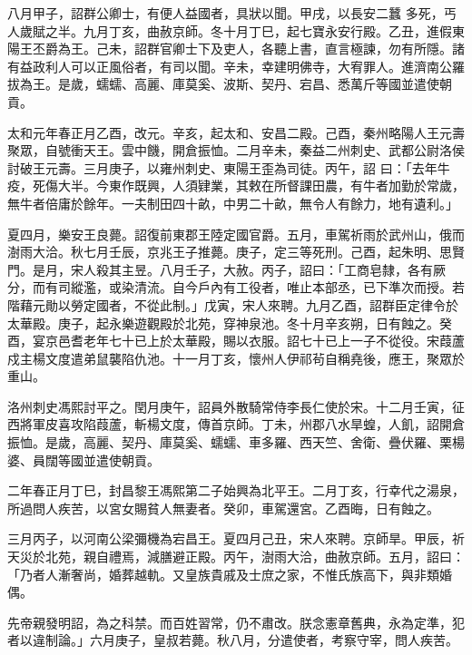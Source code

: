 \begin{pinyinscope}
 八月甲子，詔群公卿士，有便人益國者，具狀以聞。甲戌，以長安二蠶
 多死，丐人歲賦之半。九月丁亥，曲赦京師。冬十月丁巳，起七寶永安行殿。乙丑，進假東陽王丕爵為王。己未，詔群官卿士下及吏人，各聽上書，直言極諫，勿有所隱。諸有益政利人可以正風俗者，有司以聞。辛未，幸建明佛寺，大宥罪人。進濟南公羅拔為王。是歲，蠕蠕、高麗、庫莫奚、波斯、契丹、宕昌、悉萬斤等國並遣使朝貢。



 太和元年春正月乙酉，改元。辛亥，起太和、安昌二殿。己酉，秦州略陽人王元壽聚眾，自號衝天王。雲中饑，開倉振恤。二月辛未，秦益二州刺史、武都公尉洛侯討破王元壽。三月庚子，以雍州刺史、東陽王歪為司徒。丙午，詔
 曰：「去年牛疫，死傷大半。今東作既興，人須肄業，其敕在所督課田農，有牛者加勤於常歲，無牛者倍庸於餘年。一夫制田四十畝，中男二十畝，無令人有餘力，地有遺利。」



 夏四月，樂安王良薨。詔復前東郡王陸定國官爵。五月，車駕祈雨於武州山，俄而澍雨大洽。秋七月壬辰，京兆王子推薨。庚子，定三等死刑。己酉，起朱明、思賢門。是月，宋人殺其主昱。八月壬子，大赦。丙子，詔曰：「工商皂隸，各有厥分，而有司縱濫，或染清流。自今戶內有工役者，唯止本部丞，已下準次而授。若階藉元勛以勞定國者，不從此制。」戊寅，宋人來聘。九月乙酉，詔群臣定律令於
 太華殿。庚子，起永樂遊觀殿於北苑，穿神泉池。冬十月辛亥朔，日有蝕之。癸酉，宴京邑耆老年七十已上於太華殿，賜以衣服。詔七十已上一子不從役。宋葭蘆戍主楊文度遣弟鼠襲陷仇池。十一月丁亥，懷州人伊祁茍自稱堯後，應王，聚眾於重山。



 洛州刺史馮熙討平之。閏月庚午，詔員外散騎常侍李長仁使於宋。十二月壬寅，征西將軍皮喜攻陷葭蘆，斬楊文度，傳首京師。丁未，州郡八水旱蝗，人飢，詔開倉振恤。是歲，高麗、契丹、庫莫奚、蠕蠕、車多羅、西天竺、舍衛、疊伏羅、栗楊婆、員闊等國並遣使朝貢。



 二年春正月丁巳，封昌黎王馮熙第二子始興為北平王。二月丁亥，行幸代之湯泉，所過問人疾苦，以宮女賜貧人無妻者。癸卯，車駕還宮。乙酉晦，日有蝕之。



 三月丙子，以河南公梁彌機為宕昌王。夏四月己丑，宋人來聘。京師旱。甲辰，祈天災於北苑，親自禮焉，減膳避正殿。丙午，澍雨大洽，曲赦京師。五月，詔曰：「乃者人漸奢尚，婚葬越軌。又皇族貴戚及士庶之家，不惟氏族高下，與非類婚偶。



 先帝親發明詔，為之科禁。而百姓習常，仍不肅改。朕念憲章舊典，永為定準，犯者以違制論。」六月庚子，皇叔若薨。秋八月，分遣使者，考察守宰，問人疾苦。




\end{pinyinscope}
